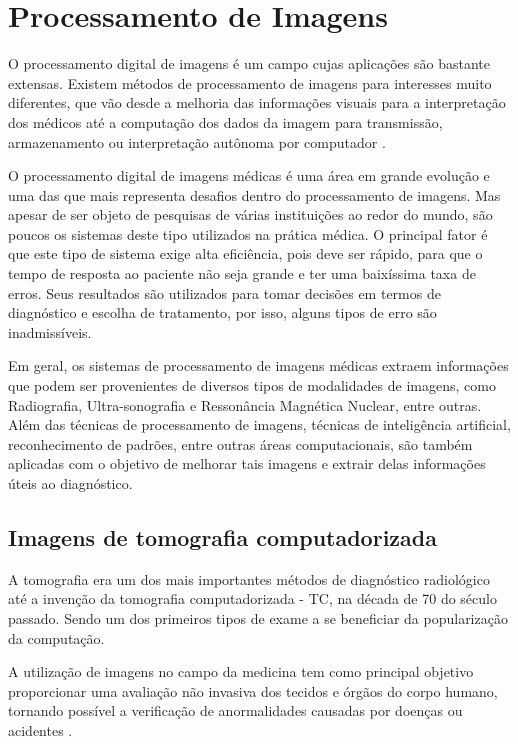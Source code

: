 \chapter{Processamento de Imagens}

O processamento digital de imagens é um campo cujas aplicações são bastante extensas. Existem métodos de processamento de imagens para interesses muito diferentes, que vão desde a melhoria das informações visuais para a interpretação dos médicos até a computação dos dados da imagem para transmissão, armazenamento ou interpretação autônoma por computador \cite{gonzalez}.

O processamento digital de imagens médicas é uma área em grande evolução e uma das que mais representa desafios dentro do processamento de imagens. Mas apesar de ser objeto de pesquisas de várias instituições ao redor do mundo, são poucos os sistemas deste tipo utilizados na prática médica. O principal fator é que este tipo de sistema exige alta eficiência, pois deve ser rápido, para que o tempo de resposta ao paciente não seja grande e ter uma baixíssima taxa de erros. Seus resultados são utilizados para tomar decisões em termos de diagnóstico e escolha de tratamento, por isso, alguns tipos de erro são inadmissíveis.

Em geral, os sistemas de processamento de imagens médicas extraem informações que podem ser provenientes de diversos tipos de modalidades de imagens, como Radiografia, Ultra-sonografia e Ressonância Magnética Nuclear, entre outras. Além das técnicas de processamento de imagens, técnicas de inteligência artificial, reconhecimento de padrões, entre outras áreas computacionais, são também aplicadas com o objetivo de melhorar tais imagens e extrair delas informações úteis ao diagnóstico.

\section{Imagens de tomografia computadorizada}

A tomografia era um dos mais importantes métodos de diagnóstico radiológico até a invenção da tomografia computadorizada - TC, na década de 70 do século passado. Sendo um dos primeiros tipos de exame a se beneficiar da popularização da computação.

A utilização de imagens no campo da medicina tem como principal objetivo proporcionar uma avaliação não invasiva dos tecidos e órgãos do corpo humano, tornando possível a verificação de anormalidades causadas por doenças ou acidentes \cite{oliveira}.


